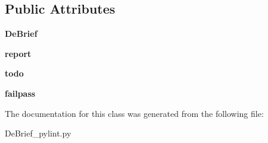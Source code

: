 \subsection*{Public Attributes}
\begin{DoxyCompactItemize}
\item 
\hypertarget{classc_1_1_de_brief__pylint_1_1_de_brief_a40b39155a0bb1a6515f5725762cc477e}{}{\bfseries De\+Brief}\label{classc_1_1_de_brief__pylint_1_1_de_brief_a40b39155a0bb1a6515f5725762cc477e}

\item 
\hypertarget{classc_1_1_de_brief__pylint_1_1_de_brief_ae54c5cd4df423292e26c28c719a11e9d}{}{\bfseries report}\label{classc_1_1_de_brief__pylint_1_1_de_brief_ae54c5cd4df423292e26c28c719a11e9d}

\item 
\hypertarget{classc_1_1_de_brief__pylint_1_1_de_brief_aaeb9446aa8ca39333e2fb79ee851e94f}{}{\bfseries todo}\label{classc_1_1_de_brief__pylint_1_1_de_brief_aaeb9446aa8ca39333e2fb79ee851e94f}

\item 
\hypertarget{classc_1_1_de_brief__pylint_1_1_de_brief_a108af3e27142c3f9d45b895db84ba1aa}{}{\bfseries failpass}\label{classc_1_1_de_brief__pylint_1_1_de_brief_a108af3e27142c3f9d45b895db84ba1aa}

\end{DoxyCompactItemize}


The documentation for this class was generated from the following file\+:\begin{DoxyCompactItemize}
\item 
De\+Brief\+\_\+pylint.\+py\end{DoxyCompactItemize}

